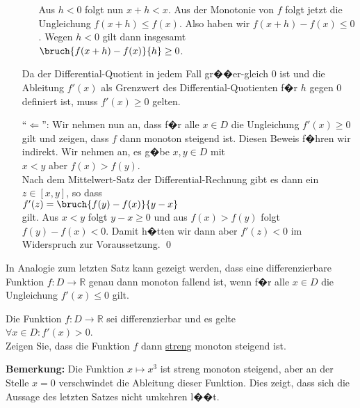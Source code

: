 \begin{enumerate}
\begin{enumerate}[(a)]
            Aus $h < 0$ folgt nun $x + h < x$.
            Aus der Monotonie von $f$ folgt jetzt die Ungleichung 
            $f(x+h) \leq f(x)$.  Also haben wir  $f(x+h)-f(x) \leq 0$.  Wegen $h<0$ gilt dann
            insgesamt
            \\[0.3cm]
            \hspace*{1.3cm} $\bruch{f(x+h) - f(x)}{h} \geq 0$.
      \end{enumerate}
      Da der Differential-Quotient in jedem Fall gr��er-gleich $0$ ist und die Ableitung $f'(x)$ als
      Grenzwert des Differential-Quotienten f�r $h$ gegen $0$ definiert ist, muss $f'(x) \geq 0$
      gelten.
\item[``$\Leftarrow$'':] Wir nehmen nun an, dass f�r alle $x\in D$ die Ungleichung $f'(x) \geq 0$ gilt und
      zeigen, dass $f$ dann monoton steigend ist.  Diesen Beweis f�hren wir indirekt.
      Wir nehmen an, es g�be $x,y\in D$ mit 
      \\[0.2cm]
      \hspace*{1.3cm} $x < y$ \quad aber \quad $f(x) > f(y)$.
      \\[0.2cm]
      Nach dem Mittelwert-Satz der Differential-Rechnung gibt es dann ein $z\in[x,y]$, so dass
      \\[0.3cm]
      \hspace*{1.3cm} $f'(z) = \bruch{f(y) - f(x)}{y - x}$
      \\[0.3cm]
      gilt.  Aus $x < y$ folgt  $y - x \geq 0$ und aus $f(x) > f(y)$ folgt $f(y) - f(x) <0$.
      Damit h�tten wir dann aber $f'(z) < 0$ im Widerspruch zur Voraussetzung.
      \qed
\end{enumerate} 
\vspace*{0.1cm}

\noindent
In Analogie zum letzten Satz kann gezeigt werden, dass eine differenzierbare Funktion 
$f:D \rightarrow \mathbb{R}$ genau dann monoton
fallend ist, wenn f�r alle $x\in D$ die Ungleichung $f'(x) \leq 0$ gilt.

\exercise
Die Funktion $f:D \rightarrow \mathbb{R}$ sei differenzierbar und es gelte
\\[0.2cm]
\hspace*{1.3cm}
$\forall x \in D: f'(x) > 0$.
\\[0.2cm]
Zeigen Sie, dass die Funktion $f$ dann \underline{stren}g monoton steigend ist.
\vspace*{0.3cm}

\noindent
\textbf{Bemerkung:}
Die Funktion $x \mapsto x^3$ ist streng monoton steigend, aber an der Stelle $x=0$
verschwindet die Ableitung dieser Funktion.  Dies zeigt, dass sich die Aussage des letzten
Satzes nicht umkehren l��t.

